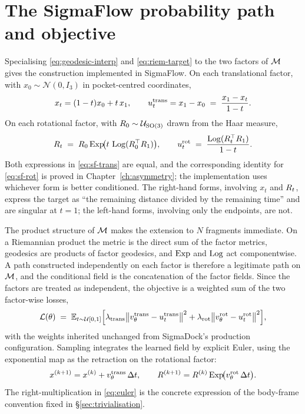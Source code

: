 \section{The SigmaFlow probability path and objective}
\label{sec:sigmaflow-objective}

Specialising \eqref{eq:geodesic-interp} and \eqref{eq:riem-target} to the two
factors of $\mathcal{M}$ gives the construction implemented in SigmaFlow. On each
translational factor, with $x_0 \sim \mathcal{N}(0, I_3)$ in pocket-centred
coordinates,
\begin{equation}
  x_t = (1-t)x_0 + t\,x_1,
  \qquad
  u_t^{\mathrm{trans}} = x_1 - x_0
  \;=\; \frac{x_1 - x_t}{1-t} .
  \label{eq:sf-trans}
\end{equation}
On each rotational factor, with $R_0 \sim \mathcal{U}_{\mathrm{SO}(3)}$ drawn from the Haar
measure,
\begin{equation}
  R_t \;=\; R_0 \operatorname{Exp}\!\bigl(t\,\operatorname{Log}(R_0^\top R_1)\bigr),
  \qquad
  u_t^{\mathrm{rot}} \;=\; \frac{\operatorname{Log}(R_t^\top R_1)}{1-t} .
  \label{eq:sf-rot}
\end{equation}
Both expressions in \eqref{eq:sf-trans} are equal, and the corresponding
identity for \eqref{eq:sf-rot} is proved in Chapter~\ref{ch:asymmetry}; the
implementation uses whichever form is better conditioned. The right-hand
forms, involving $x_t$ and $R_t$, express the target as ``the remaining
distance divided by the remaining time'' and are singular at $t=1$; the
left-hand forms, involving only the endpoints, are not.

The product structure of $\mathcal{M}$ makes the extension to $N$ fragments
immediate. On a Riemannian product the metric is the direct sum of the factor
metrics, geodesics are products of factor geodesics, and $\operatorname{Exp}$ and $\operatorname{Log}$ act
componentwise. A path constructed independently on each factor is therefore a
legitimate path on $\mathcal{M}$, and the conditional field is the concatenation of
the factor fields. Since the factors are treated as independent, the objective
is a weighted sum of the two factor-wise losses,
\begin{equation}
  \mathcal{L}(\theta) \;=\;
  \mathbb{E}_{t \sim \mathcal{U}[0,1]}\Bigl[
     \lambda_{\mathrm{trans}}\bigl\|v_\theta^{\mathrm{trans}} - u_t^{\mathrm{trans}}\bigr\|^2
   + \lambda_{\mathrm{rot}}\bigl\|v_\theta^{\mathrm{rot}} - u_t^{\mathrm{rot}}\bigr\|^2
  \Bigr],
  \label{eq:sf-objective}
\end{equation}
with the weights inherited unchanged from SigmaDock's production
configuration. Sampling integrates the learned field by explicit Euler,
using the exponential map as the retraction on the rotational factor:
\begin{equation}
  x^{(k+1)} = x^{(k)} + v_\theta^{\mathrm{trans}}\,\Delta t,
  \qquad
  R^{(k+1)} = R^{(k)}\operatorname{Exp}\!\bigl(v_\theta^{\mathrm{rot}}\,\Delta t\bigr) .
  \label{eq:euler}
\end{equation}
The right-multiplication in \eqref{eq:euler} is the concrete expression of the
body-frame convention fixed in \S\ref{sec:trivialisation}.

